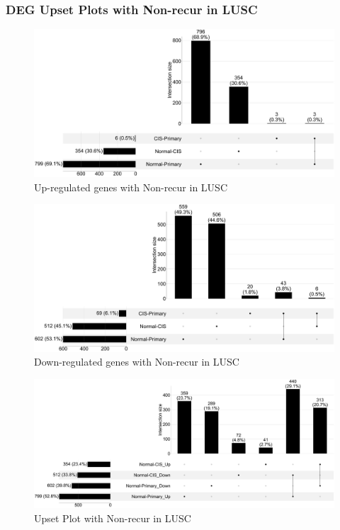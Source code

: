 \documentclass{beamer}
\begin{document}
    \begin{frame}[allowframebreaks]
        \frametitle{DEG Upset Plots with Non-recur in LUSC}

        \begin{figure}
            \includegraphics[width=0.8 \linewidth]{figures/DEG/Pair-Venn/STAR.FPKM.SQC.Nonrecur.Up.venn.pdf}
            \caption{Up-regulated genes with Non-recur in LUSC}
        \end{figure}

        \begin{figure}
            \includegraphics[width=0.8 \linewidth]{figures/DEG/Pair-Venn/STAR.FPKM.SQC.Nonrecur.Down.venn.pdf}
            \caption{Down-regulated genes with Non-recur in LUSC}
        \end{figure}

        \begin{figure}
            \includegraphics[width=0.8 \linewidth]{figures/DEG/Pair-Venn/STAR.FPKM.SQC.Nonrecur.venn.pdf}
            \caption{Upset Plot with Non-recur in LUSC}
        \end{figure}
    \end{frame}
\end{document}
